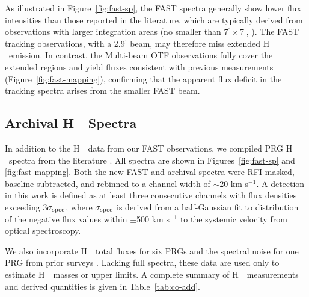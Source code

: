 \documentclass[twocolumn]{aastex631}
\def\HI{H\,  {\textsc{\romannumeral 1}}}
\begin{document}
As illustrated in Figure~\ref{fig:fast-sp}, the FAST spectra generally show lower flux intensities than those reported in the literature, which are typically derived from observations with larger integration areas (no smaller than 7$^{\prime}\times$7$^{\prime}$, \citealt{Haynes2018ApJ...861...49H}). The FAST tracking observations, with a 2.9$^{\prime}$ beam, may therefore miss extended \HI\ emission. In contrast, the Multi-beam OTF observations fully cover the extended regions and yield fluxes consistent with previous measurements (Figure~\ref{fig:fast-mapping}), confirming that the apparent flux deficit in the tracking spectra arises from the smaller FAST beam.

\subsection{Archival \HI\ Spectra}
In addition to the \HI\ data from our FAST observations, we compiled PRG \HI\ spectra from the literature \citep{Haynes2018ApJ...861...49H, Stark2021MNRAS.503.1345S, Springob2005ApJS..160..149S, Koribalski2004AJ....128...16K, Masters2014MNRAS.443.1044M}. All spectra are shown in Figures~\ref{fig:fast-sp} and \ref{fig:fast-mapping}. Both the new FAST and archival spectra were RFI-masked, baseline-subtracted, and rebinned to a channel width of $\sim$20 km s$^{-1}$. A detection in this work is defined as at least three consecutive channels with flux densities exceeding 3$\sigma_{\rm spec}$, where $\sigma_{\rm spec}$ is derived from a half-Gaussian fit to distribution of the negative flux values within $\pm$500 km s$^{-1}$ to the systemic velocity from optical spectroscopy.

We also incorporate \HI\ total fluxes for six PRGs and the spectral noise for one PRG from prior surveys \citep{Richter1994AJ....107...99R, vanDriel2002AA...386..140V}. Lacking full spectra, these data are used only to estimate \HI\ masses or upper limits. A complete summary of \HI\ measurements and derived quantities is given in Table~\ref{tab:co-add}.
\end{document}
